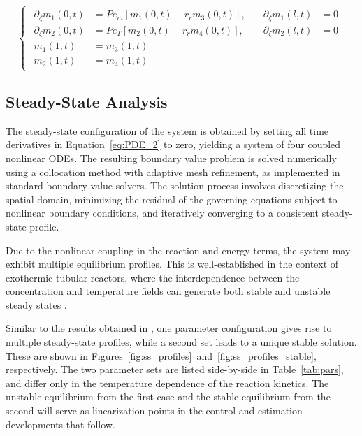 \begin{equation} \label{eq:BC_3}
\begin{cases}
\begin{alignedat}{2}
    \partial_\zeta m_1(0, t) &= Pe_m \left[ m_1(0, t) - r_r m_3(0, t) \right], \quad &\partial_{\zeta} m_1(l, t) &= 0 \\[1.5ex]

    \partial_\zeta m_2(0, t) &= Pe_T \left[ m_2(0, t) - r_r m_4(0, t) \right], \quad &\partial_{\zeta} m_2(l, t) &= 0 \\[1.5ex]

    m_1(1, t) &= m_3(1, t) \\[1.5ex]

    m_2(1, t) &= m_4(1, t)
\end{alignedat}
\end{cases}
\end{equation}


\subsection{Steady-State Analysis}

The steady-state configuration of the system is obtained by setting all time derivatives in Equation~\eqref{eq:PDE_2} to zero, yielding a system of four coupled nonlinear ODEs. The resulting boundary value problem is solved numerically using a collocation method with adaptive mesh refinement, as implemented in standard boundary value solvers. The solution process involves discretizing the spatial domain, minimizing the residual of the governing equations subject to nonlinear boundary conditions, and iteratively converging to a consistent steady-state profile.

Due to the nonlinear coupling in the reaction and energy terms, the system may exhibit multiple equilibrium profiles. This is well-established in the context of exothermic tubular reactors, where the interdependence between the concentration and temperature fields can generate both stable and unstable steady states \autocite{Heinemann1982effect, Hastir2020Analysis}.

Similar to the results obtained in \autocite{Khatibi2021Model}, one parameter configuration gives rise to multiple steady-state profiles, while a second set leads to a unique stable solution. These are shown in Figures~\ref{fig:ss_profiles}~and~\ref{fig:ss_profiles_stable}, respectively. The two parameter sets are listed side-by-side in Table~\ref{tab:pars}, and differ only in the temperature dependence of the reaction kinetics. The unstable equilibrium from the first case and the stable equilibrium from the second will serve as linearization points in the control and estimation developments that follow.

